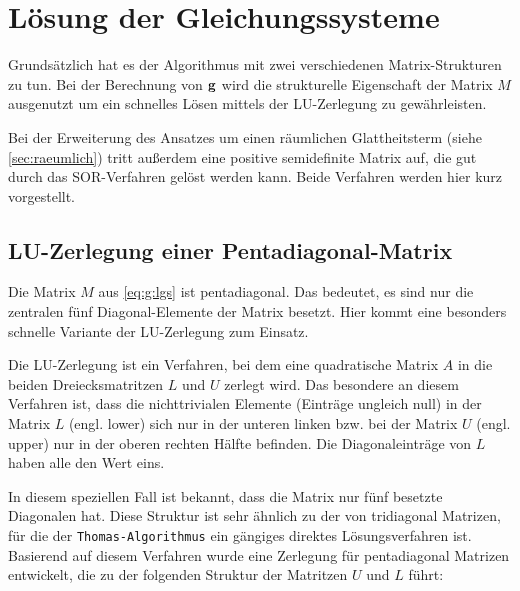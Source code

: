 \section{Lösung der Gleichungssysteme}
\label{sec:solvers}
Grundsätzlich hat es der Algorithmus mit zwei verschiedenen Matrix-Strukturen zu tun. Bei der Berechnung von $\mathbf g$ wird die strukturelle Eigenschaft der Matrix $M$ ausgenutzt um ein schnelles Lösen mittels der LU-Zerlegung zu gewährleisten.

Bei der Erweiterung des Ansatzes um einen räumlichen Glattheitsterm (siehe \autoref{sec:raeumlich}) tritt außerdem eine positive semidefinite Matrix auf, die gut durch das \gls{SOR}-Verfahren gelöst werden kann. Beide Verfahren werden hier kurz vorgestellt.



\subsection{LU-Zerlegung einer Pentadiagonal-Matrix}
\label{sec:maths:lu}
Die Matrix $M$ aus \autoref{eq:g:lgs} ist pentadiagonal. Das bedeutet, es sind nur die zentralen fünf Diagonal-Elemente der Matrix besetzt. Hier kommt eine besonders schnelle Variante der LU-Zerlegung zum Einsatz.

Die LU-Zerlegung ist ein Verfahren, bei dem eine quadratische Matrix $A$ in die beiden Dreiecksmatritzen $L$ und $U$ zerlegt wird. Das besondere an diesem Verfahren ist, dass die nichttrivialen Elemente (Einträge ungleich null) in der Matrix $L$ (engl. lower) sich nur in der unteren linken bzw. bei der Matrix $U$ (engl. upper) nur in der oberen rechten Hälfte befinden. Die Diagonaleinträge von $L$ haben alle den Wert eins. 

In diesem speziellen Fall ist bekannt, dass die Matrix nur fünf besetzte Diagonalen hat. Diese Struktur ist sehr ähnlich zu der von tridiagonal Matrizen, für die der \texttt{Thomas-Algorithmus} \cite[S. 130f]{Westermann2008} ein gängiges direktes Lösungsverfahren ist. Basierend auf diesem Verfahren wurde eine Zerlegung für pentadiagonal Matrizen entwickelt, die zu der folgenden Struktur der Matritzen $U$ und $L$ führt:

